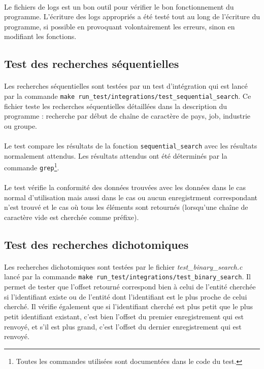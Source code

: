 \documentclass{article}
\begin{document}
    \paragraph{}
    Le fichiers de logs est un bon outil pour vérifier le bon fonctionnement du programme. L'écriture des logs appropriés a été testé tout au long de l'écriture du programme, si possible en provoquant volontairement les erreurs, sinon en modifiant les fonctions.


    \subsection{Test des recherches séquentielles}
    \paragraph{}
    Les recherches séquentielles sont testées par un test d'intégration qui est lancé par la commande \texttt{make run\_test/integrations/test\_sequential\_search}. Ce fichier teste  les recherches séquentielles détaillées dans la description du programme : recherche par début de chaîne de caractère de pays, job, industrie ou groupe.

    \paragraph{}
    Le test compare les résultats de la fonction \texttt{sequential\_search} avec les résultats normalement attendus. Les résultats attendus ont été déterminés par la commande \texttt{grep}\footnote{Toutes les commandes utilisées sont documentées dans le code du test.}.

    \paragraph{}
    Le test vérifie la conformité des données trouvées avec les données dans le cas normal d'utilisation mais aussi dans le cas ou aucun enregistrment correspondant n'est trouvé et le cas où tous les éléments sont retournés (lorsqu'une chaîne de caractère vide est cherchée comme préfixe).


    \subsection{Test des recherches dichotomiques}
    \paragraph{}
    Les recherches dichotomiques sont testées par le fichier \emph{test\_binary\_search.c} lancé par la commande \texttt{make run\_test/integrations/test\_binary\_search}. Il permet de tester que l'offset retourné correspond bien à celui de l'entité cherchée si l'identifiant existe ou de l'entité dont l'identifiant est le plus proche de celui cherché. Il vérifie également que si l'identifiant cherché est plus petit que le plus petit identifiant existant, c'est bien l'offset du premier enregistrement qui est renvoyé, et s'il est plus grand, c'est l'offset du dernier enregistrement qui est renvoyé.
\end{document}
